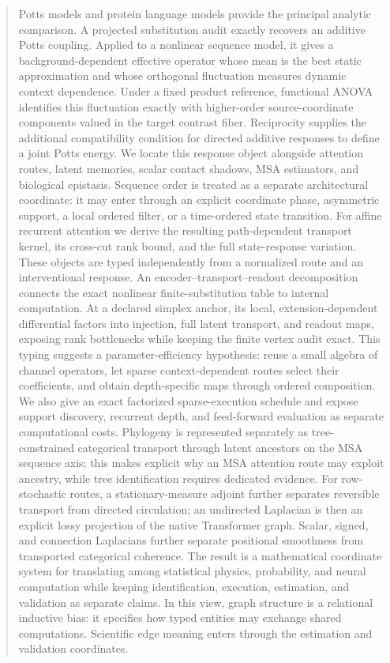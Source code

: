 \documentclass[10pt]{article}
\theoremstyle{definition}
\theoremstyle{remark}
\begin{document}
\begin{abstract}
Potts models and protein language models provide the principal analytic comparison.  A projected
substitution audit exactly recovers an additive Potts coupling.  Applied to a nonlinear sequence
model, it gives a background-dependent effective operator whose mean is the best static
approximation and whose orthogonal fluctuation measures dynamic context dependence.  Under a fixed
product reference, functional ANOVA identifies this fluctuation exactly with higher-order
source-coordinate components valued in the target contrast fiber.  Reciprocity supplies the additional compatibility
condition for directed additive responses to define a joint Potts energy.  We locate this response
object alongside attention routes, latent memories, scalar contact shadows, MSA estimators, and
biological epistasis.  Sequence order is treated as a separate architectural coordinate: it may
enter through an explicit coordinate phase, asymmetric support, a local ordered filter, or a
time-ordered state transition.  For affine recurrent attention we derive the resulting
path-dependent transport kernel, its cross-cut rank bound, and the full state-response variation.
These objects are typed independently from a normalized route and an interventional response.  An
encoder--transport--readout decomposition connects the exact nonlinear
finite-substitution table to internal computation.  At a declared simplex anchor, its local,
extension-dependent differential factors into injection, full latent transport, and readout maps,
exposing rank bottlenecks while keeping the finite vertex audit exact.  This typing suggests a
parameter-efficiency hypothesis: reuse a small algebra of channel operators, let sparse
context-dependent routes select their coefficients, and obtain depth-specific maps through ordered
composition.  We also give an exact factorized sparse-execution schedule and expose support
discovery, recurrent depth, and feed-forward evaluation as separate computational costs.  Phylogeny is
represented separately as tree-constrained categorical
transport through latent ancestors on the MSA sequence axis; this makes explicit why an MSA
attention route may exploit ancestry, while tree identification requires dedicated evidence.  For row-stochastic
routes, a stationary-measure adjoint further separates
reversible transport from directed circulation; an undirected Laplacian is then an explicit lossy
projection of the native Transformer graph.  Scalar, signed, and connection Laplacians further
separate positional smoothness from transported categorical coherence.  The result is a mathematical coordinate
system for translating among
statistical physics, probability, and neural computation while keeping identification, execution,
estimation, and validation as separate claims.  In this view, graph structure is a relational
inductive bias: it specifies how typed entities may exchange shared computations.  Scientific edge
meaning enters through the estimation and validation coordinates.
\end{abstract}
\fi
\end{document}
